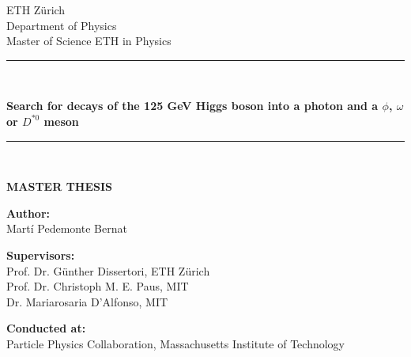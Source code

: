 \begin{titlepage}
\begin{center}

\vspace*{-2.0cm}

\begin{LARGE}
ETH Zürich\\[0.0cm]
Department of Physics\\[0.0cm]
Master of Science ETH in Physics\\
\end{LARGE}

\vspace*{0.9cm}

\rule{16cm}{0.1mm}\\
\begin{Huge}
\textbf{Search for decays of the 125 GeV Higgs boson into a photon and a $\phi$, $\omega$ or $D^{*0}$ meson} \\
\end{Huge}
\rule{16cm}{0.1mm}\\

\vspace*{1.3cm}

\textbf{\LARGE MASTER THESIS}\\

\vspace*{3.3cm}

\begin{Large}
\textbf{Author:}\\[0.0cm]
Martí Pedemonte Bernat\\[0.0cm]
\end{Large}

\vspace*{1.0cm}

\begin{Large}
\textbf{Supervisors:}\\[0.0cm]
Prof. Dr. Günther Dissertori, ETH Zürich\\[0.0cm]
Prof. Dr. Christoph M. E. Paus, MIT\\[0.0cm]
Dr. Mariarosaria D'Alfonso, MIT\\[0.0cm]
\end{Large}

\vspace*{1.0cm}

\begin{Large}
\textbf{Conducted at:}\\[0.0cm]
Particle Physics Collaboration, Massachusetts Institute of Technology\\[0.0cm]
\end{Large}


\end{center}
\end{titlepage}
